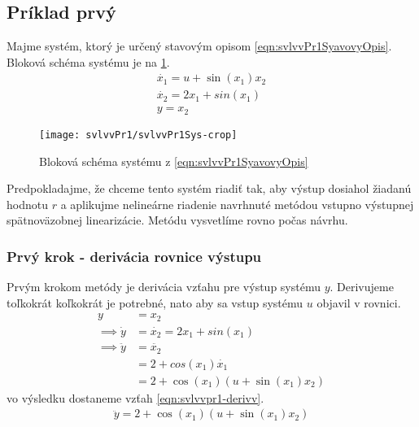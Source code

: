\documentclass[../main.tex]{subfiles}
\begin{document}
    \subsection{Príklad prvý}
	    Majme systém, ktorý je určený stavovým opisom \cref{eqn:svlvvPr1SyavovyOpis}. Bloková schéma systému je na \cref{fig:svlvvPr1BlockSchemaSystemu}.
	\begin{equation}
		\begin{gathered}
		\dot{x_1}  =u + \sin(x_1) x_2 \\
		\dot{x_2} = 2x_1 + sin(x_1) \\
		y = x_2
		\end{gathered}
		\label{eqn:svlvvPr1SyavovyOpis}
	\end{equation}
	\begin{figure}[h!]
		\centering
		\texttt{[image: svlvvPr1/svlvvPr1Sys-crop]}
		\caption{Bloková schéma systému z \cref{eqn:svlvvPr1SyavovyOpis}}
		\label{fig:svlvvPr1BlockSchemaSystemu}
	\end{figure}
	
	Predpokladajme, že chceme tento systém riadiť tak, aby výstup dosiahol žiadanú hodnotu $r$ a aplikujme nelineárne riadenie navrhnuté metódou vstupno výstupnej spätnoväzobnej linearizácie. Metódu vysvetlíme rovno počas návrhu. 
	
    \subsubsection{Prvý krok - derivácia rovnice výstupu}
    Prvým krokom metódy je derivácia vzťahu pre výstup systému $y$. Derivujeme toľkokrát koľkokrát je potrebné, nato aby sa vstup systému $u$ objavil v rovnici.
	\begin{equation*}
	\begin{aligned}
		y &= x_2 \\ 
		\implies \dot{y}  &= \dot{x_2} =  2x_1 + sin(x_1) \\
		\implies \ddot{y} &= \ddot{x_2} \\
						  &= 2 + cos(x_1)\dot{x_1} \\
						  &= 2 + \cos(x_1)(u + \sin(x_1) x_2)
		\end{aligned}
		\label{eqn:}
	\end{equation*}
    vo výsledku dostaneme vzťah \cref{eqn:svlvvpr1-derivv}.
    \begin{equation}
        \begin{aligned}
            \ddot{y} = 2 + \cos(x_1)(u + \sin(x_1) x_2) \\
        \end{aligned}
        \label{eqn:svlvvpr1-derivv}
    \end{equation} 
\end{document}
